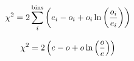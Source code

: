 \documentclass{article}
\begin{document}
\[ \chi^2=2\sum_i^{\rm bins}\left(e_i-o_i+o_i\ln\left({o_i\over e_i}\right)\right) \]
\pagebreak

\[ \chi^2=2\left(e-o+o\ln\left({o\over e}\right)\right) \]
\pagebreak
\end{document}
